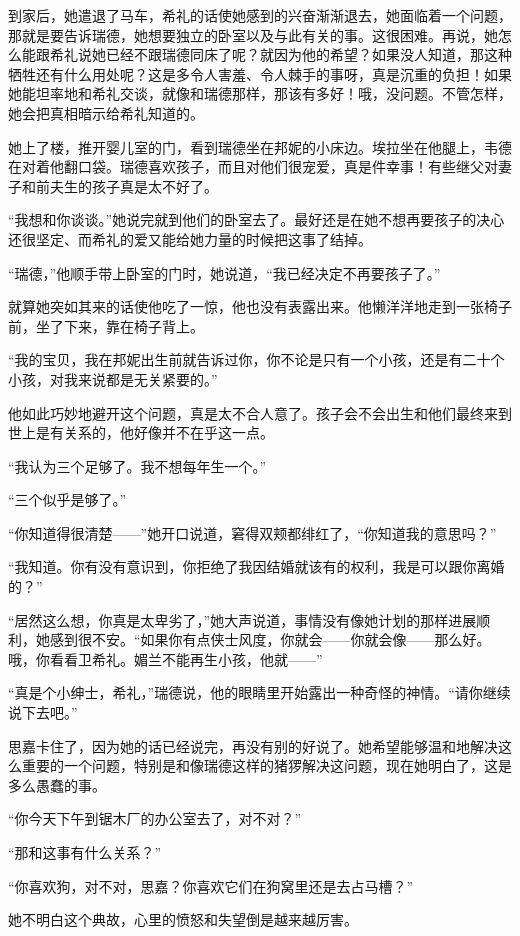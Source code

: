 \par 到家后，她遣退了马车，希礼的话使她感到的兴奋渐渐退去，她面临着一个问题，那就是要告诉瑞德，她想要独立的卧室以及与此有关的事。这很困难。再说，她怎么能跟希礼说她已经不跟瑞德同床了呢？就因为他的希望？如果没人知道，那这种牺牲还有什么用处呢？这是多令人害羞、令人棘手的事呀，真是沉重的负担！如果她能坦率地和希礼交谈，就像和瑞德那样，那该有多好！哦，没问题。不管怎样，她会把真相暗示给希礼知道的。
\par 她上了楼，推开婴儿室的门，看到瑞德坐在邦妮的小床边。埃拉坐在他腿上，韦德在对着他翻口袋。瑞德喜欢孩子，而且对他们很宠爱，真是件幸事！有些继父对妻子和前夫生的孩子真是太不好了。
\par “我想和你谈谈。”她说完就到他们的卧室去了。最好还是在她不想再要孩子的决心还很坚定、而希礼的爱又能给她力量的时候把这事了结掉。
\par “瑞德，”他顺手带上卧室的门时，她说道，“我已经决定不再要孩子了。”
\par 就算她突如其来的话使他吃了一惊，他也没有表露出来。他懒洋洋地走到一张椅子前，坐了下来，靠在椅子背上。
\par “我的宝贝，我在邦妮出生前就告诉过你，你不论是只有一个小孩，还是有二十个小孩，对我来说都是无关紧要的。”
\par 他如此巧妙地避开这个问题，真是太不合人意了。孩子会不会出生和他们最终来到世上是有关系的，他好像并不在乎这一点。
\par “我认为三个足够了。我不想每年生一个。”
\par “三个似乎是够了。”
\par “你知道得很清楚——”她开口说道，窘得双颊都绯红了，“你知道我的意思吗？”
\par “我知道。你有没有意识到，你拒绝了我因结婚就该有的权利，我是可以跟你离婚的？”
\par “居然这么想，你真是太卑劣了，”她大声说道，事情没有像她计划的那样进展顺利，她感到很不安。“如果你有点侠士风度，你就会——你就会像——那么好。哦，你看看卫希礼。媚兰不能再生小孩，他就——”
\par “真是个小绅士，希礼，”瑞德说，他的眼睛里开始露出一种奇怪的神情。“请你继续说下去吧。”
\par 思嘉卡住了，因为她的话已经说完，再没有别的好说了。她希望能够温和地解决这么重要的一个问题，特别是和像瑞德这样的猪猡解决这问题，现在她明白了，这是多么愚蠢的事。
\par “你今天下午到锯木厂的办公室去了，对不对？”
\par “那和这事有什么关系？”
\par “你喜欢狗，对不对，思嘉？你喜欢它们在狗窝里还是去占马槽？”
\par 她不明白这个典故，心里的愤怒和失望倒是越来越厉害。

